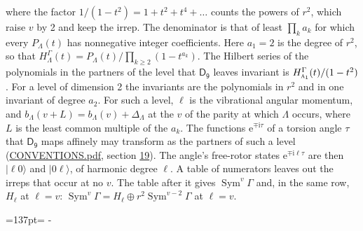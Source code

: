 \documentclass[10pt,a4paper]{article}
\newcommand{\needspace}[1]{\par\penalty-100\begingroup\dimen0=#1\relax\dimen2=\pagegoal
  \advance\dimen2-\pagetotal\ifdim\dimen0>\dimen2\relax\ifdim\dimen2>0pt\vfil\break\fi\fi
  \endgroup}
\numberwithin{equation}{section}
\newcommand{\grp}[1]{\mathsf{#1}}
\newcommand{\irr}[1]{\text{\normalfont\scshape #1}}
\newcommand{\iunit}{\mathrm{i}}
\newcommand{\expe}{\mathrm{e}}
\newcommand{\occ}[1]{\lvert #1\rangle}
\begin{document}
where the factor $1/(1 - t^2) = 1 + t^2 + t^4 + \dots$ counts the powers of $r^2$, which raise $v$ by 2 and keep the irrep. The denominator is that of least $\prod_k a_k$ for which every $P_\Lambda(t)$ has nonnegative integer coefficients. Here $a_1 = 2$ is the degree of $r^2$, so that $H^{\Gamma}_\Lambda(t) = P_\Lambda(t)/\prod_{k\ge2}(1 - t^{a_k})$. The Hilbert series of the polynomials in the partners of the level that $\grp{D_{9}}$ leaves invariant is $H^{\Gamma}_{\irr{a}_{1}}(t)/(1 - t^2)$. For a level of dimension 2 the invariants are the polynomials in $r^2$ and in one invariant of degree $a_2$. \label{n:index.overtone.period}\label{n:index.increment.unitary}For such a level, $\ell$ is the vibrational angular momentum, and $b_\Lambda(v + L) = b_\Lambda(v) + \Delta_\Lambda$ at the $v$ of the parity at which $\Lambda$ occurs, where $L$ is the least common multiple of the $a_k$. \label{n:local.torsion.angle}The functions $\expe^{\mp\iunit\tau}$ of a torsion angle $\tau$ that $\grp{D_{9}}$ maps affinely may transform as the partners of such a level (\href{../../CONVENTIONS.pdf}{CONVENTIONS.pdf}, section \href{../../CONVENTIONS.pdf\#conv.19}{19}). The angle's free-rotor states $\expe^{\mp\iunit\ell\tau}$ are then $\occ{\ell 0}$ and $\occ{0 \ell}$, of harmonic degree $\ell$. A table of numerators leaves out the irreps that occur at no $v$. The table after it gives $\operatorname{Sym}^{v}\Gamma$ and, in the same row, $H_\ell$ at $\ell = v$: $\operatorname{Sym}^{v}\Gamma = H_\ell \oplus r^2\operatorname{Sym}^{v-2}\Gamma$ at $\ell = v$.
\needspace{137pt}
\end{document}

